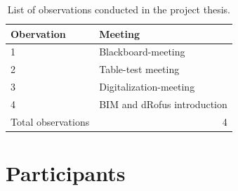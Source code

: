 \begin{table}[]
    \begin{center}
        \begin{tabular}{@{}ll@{}}
        \toprule
        \textbf{Obervation} & \textbf{Meeting}       \\ \midrule
        1                   & Blackboard-meeting     \\
        2                   & Table-test meeting     \\
        3                   & Digitalization-meeting \\
        4                   & BIM and dRofus introduction \\
        Total observations  & \multicolumn{1}{r}{4}  \\ \bottomrule
        \end{tabular}
        \caption{List of observations conducted in the project thesis.}
        \label{tab:observations}
    \end{center}
\end{table}

\section{Participants}

